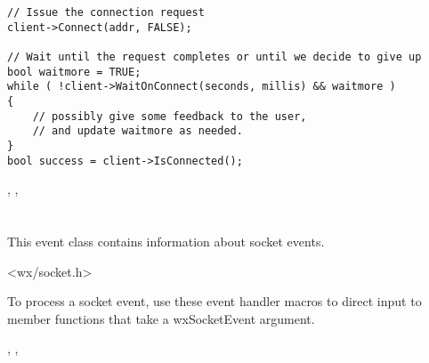 \begin{verbatim}
// Issue the connection request
client->Connect(addr, FALSE);

// Wait until the request completes or until we decide to give up
bool waitmore = TRUE; 
while ( !client->WaitOnConnect(seconds, millis) && waitmore )
{
    // possibly give some feedback to the user,
    // and update waitmore as needed.
}
bool success = client->IsConnected();
\end{verbatim}


, 
, 

\section{}\label{wxsocketevent}

This event class contains information about socket events.




<wx/socket.h>


To process a socket event, use these event handler macros to direct input
to member functions that take a wxSocketEvent argument.

\twocolwidtha{7cm}
\begin{twocollist}\itemsep=0pt
\end{twocollist}


, 
, 




